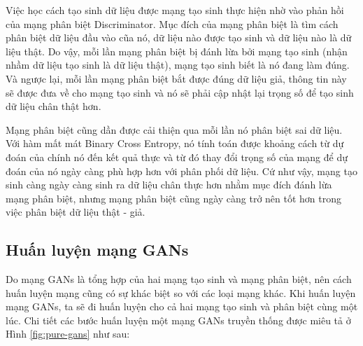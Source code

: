 Việc học cách tạo sinh dữ liệu được mạng tạo sinh thực hiện nhờ vào phản hồi của mạng phân biệt Discriminator. Mục đích của mạng phân biệt là tìm cách phân biệt dữ liệu đầu vào cũa nó, dữ liệu nào được tạo sinh và dữ liệu nào là dữ liệu thật. Do vậy, mỗi lần mạng phân biệt bị đánh lừa bởi mạng tạo sinh (nhận nhầm dữ liệu tạo sinh là dữ liệu thật), mạng tạo sinh biết là nó đang làm đúng. Và ngược lại, mỗi lần mạng phân biệt bắt được đúng dữ liệu giả, thông tin này sẽ được đưa về cho mạng tạo sinh và nó sẽ phải cập nhật lại trọng số để tạo sinh dữ liệu chân thật hơn.

Mạng phân biệt cũng dần được cải thiện qua mỗi lần nó phân biệt sai dữ liệu. Với hàm mất mát Binary Cross Entropy, nó tính toán được khoảng cách từ dự đoán của chính nó đến kết quả thực và từ đó thay đổi trọng số của mạng để dự đoán của nó ngày càng phù hợp hơn với phân phối dữ liệu. Cứ như vậy, mạng tạo sinh càng ngày càng sinh ra dữ liệu chân thực hơn nhằm mục đích đánh lừa mạng phân biệt, nhưng mạng phân biệt cũng ngày càng trở nên tốt hơn trong việc phân biệt dữ liệu thật - giả.

\subsection{Huấn luyện mạng GANs}

Do mạng GANs là tổng hợp của hai mạng tạo sinh và mạng phân biệt, nên cách huấn luyện mạng cũng có sự khác biệt so với các loại mạng khác. Khi huấn luyện mạng GANs, ta sẽ đi huấn luyện cho cả hai mạng tạo sinh và phân biệt cùng một lúc. Chi tiết các bước huấn luyện một mạng GANs truyền thống được miêu tả ở Hình \ref{fig:pure-gans} như sau:

